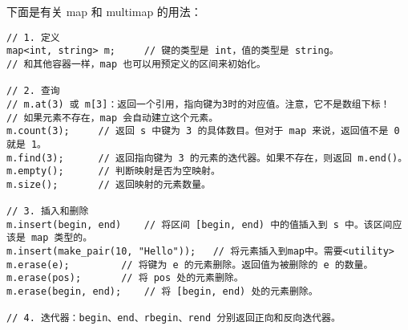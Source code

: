 	下面是有关 map 和 multimap 的用法：
	
\begin{lstlisting}	
// 1. 定义
map<int, string> m;		// 键的类型是 int，值的类型是 string。
// 和其他容器一样，map 也可以用预定义的区间来初始化。

// 2. 查询
// m.at(3) 或 m[3]：返回一个引用，指向键为3时的对应值。注意，它不是数组下标！
// 如果元素不存在，map 会自动建立这个元素。
m.count(3);		// 返回 s 中键为 3 的具体数目。但对于 map 来说，返回值不是 0 就是 1。
m.find(3);		// 返回指向键为 3 的元素的迭代器。如果不存在，则返回 m.end()。
m.empty();		// 判断映射是否为空映射。
m.size();		// 返回映射的元素数量。

// 3. 插入和删除
m.insert(begin, end)	// 将区间 [begin, end) 中的值插入到 s 中。该区间应该是 map 类型的。
m.insert(make_pair(10, "Hello"));	// 将元素插入到map中。需要<utility>
m.erase(e);			// 将键为 e 的元素删除。返回值为被删除的 e 的数量。
m.erase(pos);		// 将 pos 处的元素删除。
m.erase(begin, end);	// 将 [begin, end) 处的元素删除。

// 4. 迭代器：begin、end、rbegin、rend 分别返回正向和反向迭代器。
\end{lstlisting}